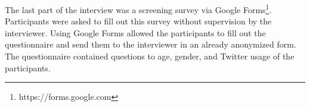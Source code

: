 The last part of the interview was a screening survey via Google Forms\footnote{https://forms.google.com}. Participants were asked to fill out this survey without supervision by the interviewer. Using Google Forms allowed the participants to fill out the questionnaire and send them to the interviewer in an already anonymized form. The questionnaire contained questions to age, gender, and Twitter usage of the participants.
